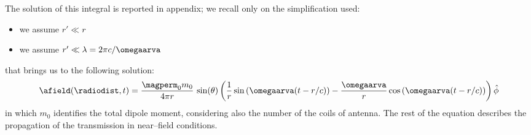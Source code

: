 The solution of this integral is reported in appendix; we recall only on the simplification used:
\begin{itemize}
\item we assume $r' \ll r$
\item we assume $r' \ll \lambda = 2\pi c/\omegaarva$
\end{itemize}
that brings us to the following solution:
\begin{equation}
\label{eq:soluzioneint}
\afield(\radiodist,t) = \dfrac{\magperm_0 m_0}{4\pi r}\,\sin(\theta)\left( \dfrac{1}{r} \sin\left(\omegaarva(t-r/c)\right) - \dfrac{\omegaarva}{r}\cos\left(\omegaarva(t-r/c)\right)\right)\hat{\phi}
\end{equation}
in which $m_0$ identifies the total dipole moment, considering also the number of the coils of antenna. The rest of the equation describes the propagation of the transmission in near--field conditions.

